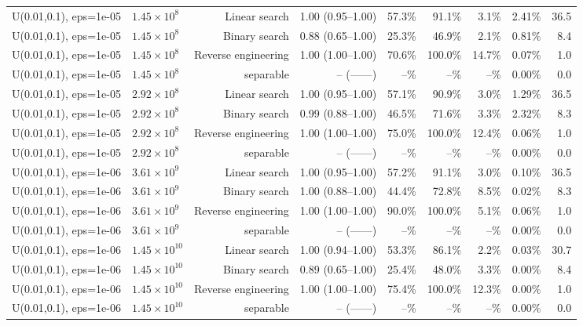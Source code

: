 \begin{tabular}{llrrrrrrr}
U(0.01,0.1), eps=1e-05 & $1.45\times 10^{8}$ & Linear search & 1.00 (0.95--1.00) & 57.3\% & 91.1\% & 3.1\% & 2.41\% & 36.5 \\
U(0.01,0.1), eps=1e-05 & $1.45\times 10^{8}$ & Binary search & 0.88 (0.65--1.00) & 25.3\% & 46.9\% & 2.1\% & 0.81\% & 8.4 \\
U(0.01,0.1), eps=1e-05 & $1.45\times 10^{8}$ & Reverse engineering & 1.00 (1.00--1.00) & 70.6\% & 100.0\% & 14.7\% & 0.07\% & 1.0 \\
U(0.01,0.1), eps=1e-05 & $1.45\times 10^{8}$ & separable & -- (------) & --\% & --\% & --\% & 0.00\% & 0.0 \\
U(0.01,0.1), eps=1e-05 & $2.92\times 10^{8}$ & Linear search & 1.00 (0.95--1.00) & 57.1\% & 90.9\% & 3.0\% & 1.29\% & 36.5 \\
U(0.01,0.1), eps=1e-05 & $2.92\times 10^{8}$ & Binary search & 0.99 (0.88--1.00) & 46.5\% & 71.6\% & 3.3\% & 2.32\% & 8.3 \\
U(0.01,0.1), eps=1e-05 & $2.92\times 10^{8}$ & Reverse engineering & 1.00 (1.00--1.00) & 75.0\% & 100.0\% & 12.4\% & 0.06\% & 1.0 \\
U(0.01,0.1), eps=1e-05 & $2.92\times 10^{8}$ & separable & -- (------) & --\% & --\% & --\% & 0.00\% & 0.0 \\
U(0.01,0.1), eps=1e-06 & $3.61\times 10^{9}$ & Linear search & 1.00 (0.95--1.00) & 57.2\% & 91.1\% & 3.0\% & 0.10\% & 36.5 \\
U(0.01,0.1), eps=1e-06 & $3.61\times 10^{9}$ & Binary search & 1.00 (0.88--1.00) & 44.4\% & 72.8\% & 8.5\% & 0.02\% & 8.3 \\
U(0.01,0.1), eps=1e-06 & $3.61\times 10^{9}$ & Reverse engineering & 1.00 (1.00--1.00) & 90.0\% & 100.0\% & 5.1\% & 0.06\% & 1.0 \\
U(0.01,0.1), eps=1e-06 & $3.61\times 10^{9}$ & separable & -- (------) & --\% & --\% & --\% & 0.00\% & 0.0 \\
U(0.01,0.1), eps=1e-06 & $1.45\times 10^{10}$ & Linear search & 1.00 (0.94--1.00) & 53.3\% & 86.1\% & 2.2\% & 0.03\% & 30.7 \\
U(0.01,0.1), eps=1e-06 & $1.45\times 10^{10}$ & Binary search & 0.89 (0.65--1.00) & 25.4\% & 48.0\% & 3.3\% & 0.00\% & 8.4 \\
U(0.01,0.1), eps=1e-06 & $1.45\times 10^{10}$ & Reverse engineering & 1.00 (1.00--1.00) & 75.4\% & 100.0\% & 12.3\% & 0.00\% & 1.0 \\
U(0.01,0.1), eps=1e-06 & $1.45\times 10^{10}$ & separable & -- (------) & --\% & --\% & --\% & 0.00\% & 0.0 \\

\end{tabular}
